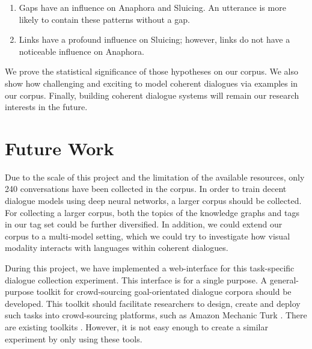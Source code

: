 \documentclass[bsc,frontabs,twoside,singlespacing,parskip,deptreport]{infthesis}     %
\begin{document}
\begin{enumerate}
   \item Gaps have an influence on Anaphora and Sluicing. An utterance is more likely to contain these patterns without a gap.

   \item Links have a profound influence on Sluicing; however, links do not have a noticeable influence on Anaphora.
\end{enumerate}

We prove the statistical significance of those hypotheses on our corpus. We also show how challenging and exciting to model coherent dialogues via examples in our corpus. Finally, building coherent dialogue systems will remain our research interests in the future.

\section{Future Work}

Due to the scale of this project and the limitation of the available resources, only 240 conversations have been collected in the corpus. In order to train decent dialogue models using deep neural networks, a larger corpus should be collected. For collecting a larger corpus, both the topics of the knowledge graphs and tags in our tag set could be further diversified. In addition, we could extend our corpus to a multi-model setting, which we could try to investigate how visual modality interacts with languages within coherent dialogues.

During this project, we have implemented a web-interface for this task-specific dialogue collection experiment. This interface is for a single purpose. A general-purpose toolkit for crowd-sourcing goal-orientated dialogue corpora should be developed. This toolkit should facilitate researchers to design, create and deploy such tasks into crowd-sourcing platforms, such as Amazon Mechanic Turk \cite{mturk}. There are existing toolkits \cite{lee2018dialcrowd,miller2017parlai}. However, it is not easy enough to create a similar experiment by only using these tools.
\end{document}
